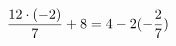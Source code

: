 \documentclass[preview]{standalone}
\begin{document}
\begin{align*}
\special{dvisvgm:raw <g id='unique000'>}\frac{12 \cdot (-2)}{7} + 8 = 4 - 2 (- \frac{2}{7})\special{dvisvgm:raw </g>}
\end{align*}
\end{document}
